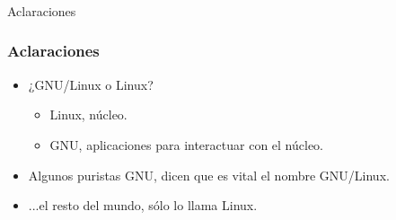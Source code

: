 \frame
{
\frametitle{}
\begin{center}
	\Huge{Aclaraciones}
\end{center}
}

\frame
{
\frametitle{Aclaraciones}
\begin{itemize}
	\item ¿GNU/Linux o Linux?
	\begin{itemize}
		\item Linux, núcleo.
		\item GNU, aplicaciones para interactuar con el núcleo.
	\end{itemize}
	\item Algunos puristas GNU, dicen que es vital el nombre GNU/Linux.
	\item ...el resto del mundo, sólo lo llama Linux.
\end{itemize}
}
